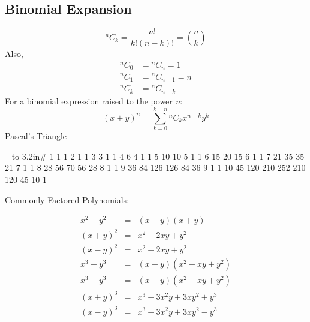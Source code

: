 \documentclass[12pt]{article}
\begin{document}
\subsection{Binomial Expansion}
$$^nC_k = \frac{n!}{k!(n-k)!} = {n\choose k} $$
Also,
\begin{align*}
	{^nC_0} &= {^nC_n} = 1 \\
	{^nC_1} &= {^nC_{n-1}} = n \\
	{^nC_k} &= {^nC_{n-k}}
\end{align*}
For a binomial expression raised to the power \emph{n}:
$${(x+y)}^n  = \sum_{k=0}^{k=n} {^nC_k} x^{n-k}y^k$$
Pascal's Triangle \\
\begin{center}
	~
\vbox{\offinterlineskip 
	\halign to 3.2in{\quad\hfil#\hfil{} \cr\noalign{\vskip 1 mm}
		1\hskip5.010mm 1 \cr\noalign{\vskip 1 mm}
		1\hskip5.015mm 2\hskip5.015mm 1 \cr\noalign{\vskip 1 mm}
		1\hskip5.025mm 3\hskip5.025mm 3\hskip5.025mm 1 \cr\noalign{\vskip 1 mm}
		1\hskip5.05mm 4\hskip5.05mm 6\hskip5.05mm 4\hskip5.05mm 1 \cr\noalign{\vskip 1.5 mm}
		1\hskip5mm 5\hskip5mm 10\hskip5mm 10\hskip5mm 5\hskip5mm 1 \cr\noalign{\vskip 1.5 mm}
		1\hskip4.90mm 6\hskip4.90mm 15\hskip4.90mm 20\hskip4.90mm 15\hskip4.90mm 6\hskip4.90mm 1 \cr\noalign{\vskip 1.5 mm}
		1\hskip4.75mm 7\hskip4.75mm 21\hskip4.75mm 35\hskip4.75mm 35\hskip4.75mm 21\hskip4.75mm 7\hskip4.75mm 1 \cr\noalign{\vskip 1.5 mm}
		1\hskip4.5mm 8\hskip4.5mm 28\hskip4.5mm 56\hskip4.5mm 70\hskip4.5mm 56\hskip4.5mm 28\hskip4.5mm 8\hskip4.5mm 1 \cr\noalign{\vskip 1.5 mm}
		1\hskip4mm 9\hskip4mm 36\hskip4mm 84\hskip4mm 126\hskip4mm 126\hskip4mm 84\hskip4mm 36\hskip4mm 9\hskip4mm 1 \cr\noalign{\vskip 1.5 mm}
		1\hskip3mm 10\hskip3mm 45\hskip3mm 120\hskip3mm 210\hskip3mm 252\hskip3mm 210\hskip3mm 120\hskip3mm 45\hskip3mm 10\hskip3mm 1 \cr\noalign{\vskip 1.5 mm}
	}
}
\end{center}
Commonly Factored Polynomials:

$$
\begin{array}{lcl}
		{x^2-y^2} &=& (x-y)(x+y) \\
		{(x+y)^2} &=& x^2+2xy+y^2\\
		{(x-y)^2} &=& x^2-2xy+y^2\\	
		{x^3-y^3} &=& (x-y)(x^2+xy+y^2)\\
		{x^3+y^3} &=& (x+y)(x^2-xy+y^2)\\
		{(x+y)^3} &=& x^3+3x^2y+3xy^2+y^3\\
		{(x-y)^3} &=& x^3-3x^2y+3xy^2-y^3\\
\end{array}
$$
\end{document}
